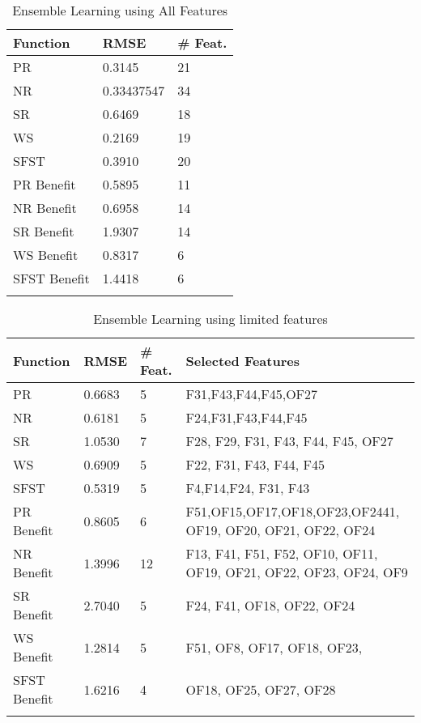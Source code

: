 \begin{longtable}{|p{3cm}|p{2cm}|p{2cm}|}
\hline
\textbf{Function} & \textbf{RMSE} & \textbf{\# Feat.} \\ \hline
PR &  0.3145 & 21 \\ \hline
NR & 0.33437547 & 34  \\ \hline
SR &  0.6469 & 18  \\ \hline
WS & 0.2169 & 19  \\ \hline
SFST &  0.3910 & 20  \\ \hline
PR Benefit &  0.5895 & 11  \\ \hline
NR Benefit &  0.6958 & 14 \\ \hline
SR Benefit &  1.9307 & 14  \\ \hline
WS Benefit & 0.8317 & 6  \\ \hline
SFST Benefit & 1.4418  & 6   \\ \hline
\caption{Ensemble Learning using All Features}
\label{lowest_best_rmse_featred}
\end{longtable}

\begin{longtable}{|p{3cm}|p{2cm}|p{2cm}|p{8cm}|}
\hline
\textbf{Function} & \textbf{RMSE} & \textbf{\# Feat.} & \textbf{Selected Features} \\ \hline

PR & 0.6683 & 5 & F31,F43,F44,F45,OF27 \\ \hline
NR & 0.6181 & 5 & F24,F31,F43,F44,F45 \\ \hline
SR & 1.0530 & 7 & F28, F29, F31, F43, F44, F45, OF27 \\ \hline
WS &  0.6909 & 5 & F22, F31, F43, F44, F45\\ \hline
SFST &  0.5319 & 5 & F4,F14,F24, F31, F43\\ \hline
PR Benefit & 0.8605 & 6 & F51,OF15,OF17,OF18,OF23,OF2441, OF19, OF20, OF21, OF22, OF24 \\ \hline
NR Benefit &  1.3996 &12 &  F13, F41, F51, F52, OF10, OF11, OF19, OF21, OF22, OF23, OF24, OF9 \\ \hline
SR Benefit &  2.7040 & 5&  F24, F41, OF18, OF22, OF24\\ \hline
WS Benefit &  1.2814 & 5 &  F51, OF8, OF17, OF18, OF23, \\ \hline
SFST Benefit & 1.6216  & 4 & OF18, OF25, OF27, OF28 \\ \hline
\caption{Ensemble Learning using limited features}
\label{lowest_smallest_rmse_featred}
\end{longtable}